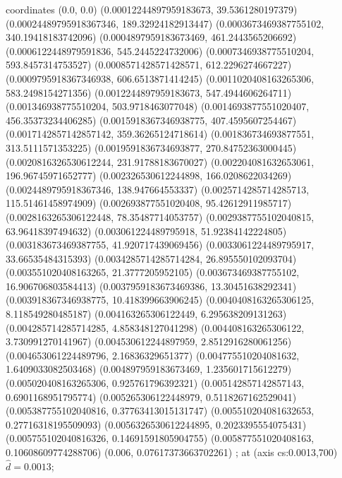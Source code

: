  coordinates {
        (0.0, 0.0)
        (0.00012244897959183673, 39.5361280197379)
        (0.00024489795918367346, 189.32924182913447)
        (0.0003673469387755102, 340.19418183742096)
        (0.0004897959183673469, 461.2443565206692)
        (0.0006122448979591836, 545.2445224732006)
        (0.0007346938775510204, 593.8457314753527)
        (0.0008571428571428571, 612.2296274667227)
        (0.0009795918367346938, 606.6513871414245)
        (0.0011020408163265306, 583.2498154271356)
        (0.0012244897959183673, 547.4944606264711)
        (0.001346938775510204, 503.9718463077048)
        (0.0014693877551020407, 456.35373234406285)
        (0.0015918367346938775, 407.4595607254467)
        (0.0017142857142857142, 359.36265124718614)
        (0.001836734693877551, 313.5111571353225)
        (0.0019591836734693877, 270.84752363000445)
        (0.0020816326530612244, 231.91788183670027)
        (0.002204081632653061, 196.96745971652777)
        (0.002326530612244898, 166.0208622034269)
        (0.0024489795918367346, 138.947664553337)
        (0.0025714285714285713, 115.51461458974909)
        (0.002693877551020408, 95.42612911985717)
        (0.0028163265306122448, 78.35487714053757)
        (0.0029387755102040815, 63.96418397494632)
        (0.003061224489795918, 51.92384142224805)
        (0.003183673469387755, 41.920717439069456)
        (0.0033061224489795917, 33.66535484315393)
        (0.0034285714285714284, 26.895550102093704)
        (0.003551020408163265, 21.3777205952105)
        (0.003673469387755102, 16.906706803584413)
        (0.0037959183673469386, 13.30451638292341)
        (0.003918367346938775, 10.418399663906245)
        (0.0040408163265306125, 8.118549280485187)
        (0.004163265306122449, 6.295638209131263)
        (0.004285714285714285, 4.858348127041298)
        (0.004408163265306122, 3.730991270141967)
        (0.004530612244897959, 2.8512916280061256)
        (0.004653061224489796, 2.16836329651377)
        (0.004775510204081632, 1.6409033082503468)
        (0.004897959183673469, 1.235601715612279)
        (0.005020408163265306, 0.925761796392321)
        (0.005142857142857143, 0.6901168951795774)
        (0.005265306122448979, 0.5118267162529041)
        (0.005387755102040816, 0.37763413015131747)
        (0.005510204081632653, 0.27716318195509093)
        (0.0056326530612244895, 0.2023395554075431)
        (0.005755102040816326, 0.14691591805904755)
        (0.005877551020408163, 0.10608609774288706)
        (0.006, 0.07617373663702261)
};
 at (axis cs:0.0013,700){\small{$\hat{d} = 0.0013$}};